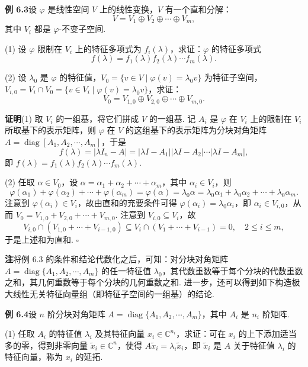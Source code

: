 \documentclass[UTF8,12pt,a4paper,fontset=fandol]{ctexart}
\begin{document}
\noindent\textbf{例 6.3}\quad 设 $\varphi$ 是线性空间 $V$ 上的线性变换，$V$ 有一个直和分解：
\[
V=V_1\oplus V_2\oplus\cdots\oplus V_m,
\]
其中 $V_i$ 都是 $\varphi$-不变子空间.

(1) 设 $\varphi$ 限制在 $V_i$ 上的特征多项式为 $f_i(\lambda)$，求证：$\varphi$ 的特征多项式
\[
f(\lambda)=f_1(\lambda)f_2(\lambda)\cdots f_m(\lambda).
\]

(2) 设 $\lambda_0$ 是 $\varphi$ 的特征值，$V_0=\{v\in V\mid \varphi(v)=\lambda_0v\}$ 为特征子空间，$V_{i,0}=V_i\cap V_0=\{v\in V_i\mid \varphi(v)=\lambda_0v\}$，求证：
\[
V_0=V_{1,0}\oplus V_{2,0}\oplus\cdots\oplus V_{m,0}.
\]

\noindent\textbf{证明}\quad (1) 取 $V_i$ 的一组基，将它们拼成 $V$ 的一组基. 记 $A_i$ 是 $\varphi$ 在 $V_i$ 上的限制在 $V_i$ 所取基下的表示矩阵，则 $\varphi$ 在 $V$ 的这组基下的表示矩阵为分块对角矩阵 $A=\operatorname{diag}[A_1,A_2,\cdots,A_m]$，于是
\[
f(\lambda)=|\lambda I_n-A|=|\lambda I-A_1||\lambda I-A_2|\cdots|\lambda I-A_m|,
\]
即 $f(\lambda)=f_1(\lambda)f_2(\lambda)\cdots f_m(\lambda)$.

(2) 任取 $\alpha\in V_0$，设 $\alpha=\alpha_1+\alpha_2+\cdots+\alpha_m$，其中 $\alpha_i\in V_i$，则
\[
\varphi(\alpha_1)+\varphi(\alpha_2)+\cdots+\varphi(\alpha_m)=\varphi(\alpha)=\lambda_0\alpha=\lambda_0\alpha_1+\lambda_0\alpha_2+\cdots+\lambda_0\alpha_m.
\]
注意到 $\varphi(\alpha_i)\in V_i$，故由直和的充要条件可得 $\varphi(\alpha_i)=\lambda_0\alpha_i$，即 $\alpha_i\in V_{i,0}$，从而 $V_0=V_{1,0}+V_{2,0}+\cdots+V_{m,0}$. 注意到 $V_{i,0}\subseteq V_i$，故
\[
V_{i,0}\cap (V_{1,0}+\cdots+V_{i-1,0})\subseteq V_i\cap (V_1+\cdots+V_{i-1})=0,\quad 2\le i\le m,
\]
于是上述和为直和. $\square$

\noindent\textbf{注}\quad 将例 6.3 的条件和结论代数化之后，可知：对分块对角矩阵 $A=\operatorname{diag}\{A_1,A_2,\cdots,A_m\}$ 的任一特征值 $\lambda_0$，其代数重数等于每个分块的代数重数之和，其几何重数等于每个分块的几何重数之和. 进一步，还可以得到如下构造极大线性无关特征向量组（即特征子空间的一组基）的结论.

\noindent\textbf{例 6.4}\quad 设 $n$ 阶分块对角矩阵 $A=\operatorname{diag}\{A_1,A_2,\cdots,A_m\}$，其中 $A_i$ 是 $n_i$ 阶矩阵.

(1) 任取 $A_i$ 的特征值 $\lambda_i$ 及其特征向量 $x_i\in\mathbb{C}^{n_i}$，求证：可在 $x_i$ 的上下添加适当多的零，得到非零向量 $\widetilde{x}_i\in\mathbb{C}^n$，使得 $A\widetilde{x}_i=\lambda_i\widetilde{x}_i$，即 $\widetilde{x}_i$ 是 $A$ 关于特征值 $\lambda_i$ 的特征向量，称为 $x_i$ 的延拓.
\end{document}
